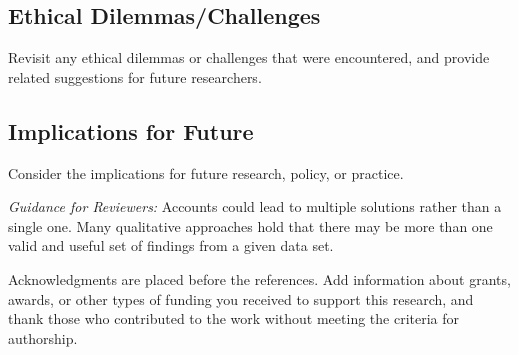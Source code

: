 \documentclass[acmsmall,screen,anonymous,review]{acmart}
\begin{document}
\subsection{Ethical Dilemmas/Challenges}
Revisit any ethical dilemmas or challenges that were encountered, and provide related suggestions for future researchers.

\subsection{Implications for Future}
Consider the implications for future research, policy, or practice.

\textit{Guidance for Reviewers:} Accounts could lead to multiple solutions rather than a single one. Many qualitative approaches hold that there may be more than one valid and useful set of findings from a given data set.

\begin{acks}
Acknowledgments are placed before the references. Add information about grants, awards, or other types of funding you received to support this research, and thank those who contributed to the work without meeting the criteria for authorship.
\end{acks}




\appendix
\end{document}
